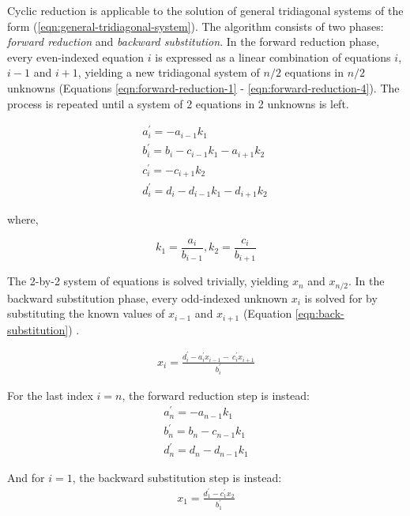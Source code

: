 \documentclass{elsarticle}
\begin{document}
Cyclic reduction is applicable to the solution of
general tridiagonal systems of the form
(\ref{eqn:general-tridiagonal-system}).
The algorithm consists of two phases:
\emph{forward reduction} and \emph{backward substitution}.
In the forward reduction phase,
every even-indexed equation $i$
is expressed as a
linear combination of equations $i$, $i-1$ and $i+1$,
yielding a new tridiagonal system of
$n/2$ equations in $n/2$ unknowns
(Equations \ref{eqn:forward-reduction-1} - \ref{eqn:forward-reduction-4}).
The process is repeated until a system of
2 equations in 2 unknowns is left.

\begin{align} 
& a^{\prime}_i = -a_{i-1}k_1 \
    \label{eqn:forward-reduction-1}& \\
& b^{\prime}_i = b_i - c_{i-1}k_1 - a_{i+1}k_2 \
    \label{eqn:forward-reduction-2}& \\
& c^{\prime}_i = -c_{i+1}k_2 \
    \label{eqn:forward-reduction-3}& \\
& d^{\prime}_i = d_i - d_{i-1}k_1  - d_{i+1}k_2 \
    \label{eqn:forward-reduction-4}&
\end{align}

where,

\begin{equation*}
k_1 = \frac{a_i}{b_{i-1}},
k_2 = \frac{c_i}{b_{i+1}}
\end{equation*}

The 2-by-2 system of equations is solved trivially,
yielding $x_n$ and $x_{n/2}$.
In the backward substitution phase,
every odd-indexed unknown $x_i$ is solved for by
substituting the known values of $x_{i-1}$ and $x_{i+1}$
(Equation \ref{eqn:back-substitution}) .

\begin{align} \label{eqn:back-substitution}
x_i = \frac{d^{\prime}_i - a^{\prime}_ix_{i-1} - \
    c^{\prime}_ix_{i+1}}{b^{\prime}_i}
\end{align}

For the last index $i=n$,
the forward reduction step is instead:
\begin{align} \label{eqn:forward-reduction-last}
    & a^{\prime}_n = -a_{n-1}k_1 & \\
    & b^{\prime}_n = b_n - c_{n-1}k_1 & \\
    & d^{\prime}_n = d_n - d_{n-1}k_1&
\end{align}

And for $i=1$, the backward substitution step is instead:
\begin{align} \label{eqn:back-substitution-first}
x_1 = \frac{d^{\prime}_1 - c^{\prime}_1x_{2}}{b^{\prime}_1}
\end{align}
\end{document}
